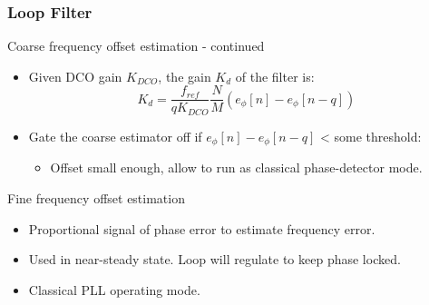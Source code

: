 \documentclass[t, screen, aspectratio=43]{beamer}
\begin{document}
\begin{frame}
	\frametitle{Loop Filter}
	\begin{block}{Coarse frequency offset estimation - continued}
		\begin{itemize}
			\footnotesize
			\item Given DCO gain $K_{DCO}$, the gain $K_d$ of the filter is:
			\tiny
			\vspace{-0.5em}
			\begin{equation}
				K_{d} = \frac{f_{ref}}{qK_{DCO}}\frac{N}{M}\left( e_\phi[n]-e_\phi[n-q]\right )
			\end{equation}				
			\footnotesize	
			\item Gate the coarse estimator off if $e_\phi[n]-e_\phi[n-q]$ < some threshold:
			\begin{itemize}
				\scriptsize
				\item Offset small enough, allow to run as classical phase-detector mode.
			\end{itemize}	
		\end{itemize} 
	\end{block}
	\begin{block}{Fine frequency offset estimation}
		\begin{itemize}
			\footnotesize
			\item Proportional signal of phase error to estimate frequency error.
			\item Used in near-steady state. Loop will regulate to keep phase locked.
			\item Classical PLL operating mode.
		\end{itemize} 	
	\end{block}
\end{frame}
\end{document}

